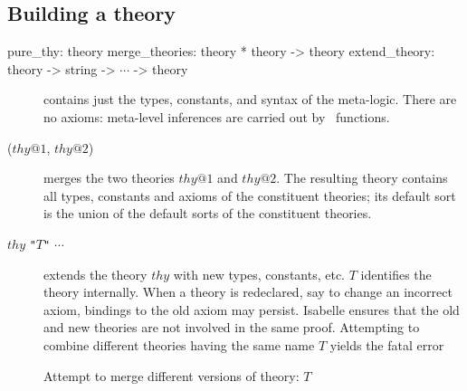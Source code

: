 \subsection{Building a theory}
\label{BuildingATheory}
\begin{ttbox} 
pure_thy: theory
merge_theories: theory * theory -> theory
extend_theory: theory -> string -> \(\cdots\) -> theory
\end{ttbox}
\begin{description}
\item[] contains just the types, constants, and syntax
  of the meta-logic.  There are no axioms: meta-level inferences are carried
  out by \ML\ functions.
\item[ ($thy@1$, $thy@2$)] merges the two
  theories $thy@1$ and $thy@2$.  The resulting theory contains all types,
  constants and axioms of the constituent theories; its default sort is the
  union of the default sorts of the constituent theories.
\item [ $thy$ {\tt"}$T${\tt"} $\cdots$] extends
  the theory $thy$ with new types, constants, etc.  $T$ identifies the theory
  internally.  When a theory is redeclared, say to change an incorrect axiom,
  bindings to the old axiom may persist.  Isabelle ensures that the old and
  new theories are not involved in the same proof.  Attempting to combine
  different theories having the same name $T$ yields the fatal error
\begin{ttbox}
Attempt to merge different versions of theory: \(T\)
\end{ttbox}
\end{description}

